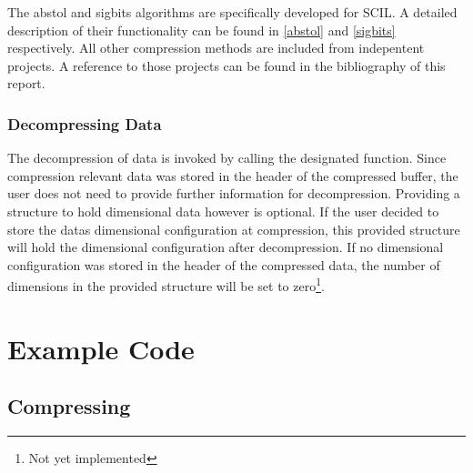 \documentclass[
	12pt,
	a4paper,
	BCOR10mm,
	DIV14,
	headsepline,
]{scrreprt}
\begin{document}
\setcounter{footnote}{0}

\bigskip

The abstol and sigbits algorithms are specifically developed for SCIL. A
detailed description of their functionality can be found in \cref{abstol} and
\cref{sigbits} respectively. All other compression methods are included from
indepentent projects. A reference to those projects can be found in the
bibliography of this report.

\clearpage

\subsection{Decompressing Data}

\bigskip

The decompression of data is invoked by calling the designated function. Since
compression relevant data was stored in the header of the compressed buffer, the
user does not need to provide further information for decompression. Providing a
structure to hold dimensional data however is optional. If the user decided to
store the datas dimensional configuration at compression, this provided
structure will hold the dimensional configuration after decompression. If no
dimensional configuration was stored in the header of the compressed data, the
number of dimensions in the provided structure will be set to
zero\footnote{Not yet implemented}.

\setcounter{footnote}{0}

\chapter{Example Code}


\section{Compressing}

\bigskip
\end{document}
